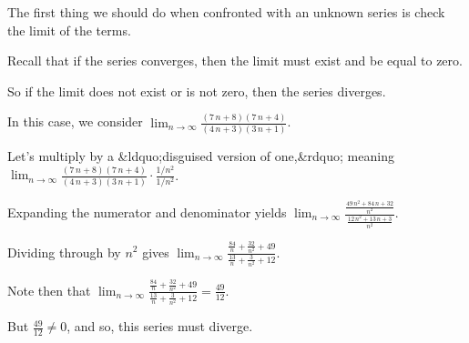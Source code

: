 \documentclass{ximera}
\begin{document}
\begin{question}
  \begin{solution}
    \begin{hint}
      The first thing we should do when confronted with an unknown series is check the limit of the terms.
    \end{hint}
    \begin{hint}
      Recall that if the series converges, then the limit must exist and be equal to zero.
    \end{hint}
    \begin{hint}
      So if the limit does not exist or is not zero, then the series diverges.
    \end{hint}
    \begin{hint}
      In this case, we consider \(\displaystyle\lim_{n \to \infty} \displaystyle\frac{ {\left(7 \, n + 8\right)} {\left(7 \, n + 4\right)}}{ {\left(4 \, n + 3\right)} {\left(3 \, n + 1\right)}}\).
    \end{hint}
    \begin{hint}
      Let's multiply by a &ldquo;disguised version of one,&rdquo; meaning \(\displaystyle\lim_{n \to \infty} \displaystyle\frac{ {\left(7 \, n + 8\right)} {\left(7 \, n + 4\right)}}{ {\left(4 \, n + 3\right)} {\left(3 \, n + 1\right)}} \cdot \displaystyle\frac{1/n^{2}}{1/n^{2}}\).
    \end{hint}
    \begin{hint}
      Expanding the numerator and denominator yields \(\displaystyle\lim_{n \to \infty} \displaystyle\frac{\displaystyle\frac{49 \, n^{2} + 84 \, n + 32}{n^{2}}}{\displaystyle\frac{12 \, n^{2} + 13 \, n + 3}{n^{2}}}\).
    \end{hint}
    \begin{hint}
      Dividing through by \(n^{2}\) gives \(\displaystyle\lim_{n \to \infty} \displaystyle\frac{\displaystyle\frac{84}{n} + \displaystyle\frac{32}{n^{2}} + 49}{\displaystyle\frac{13}{n} + \displaystyle\frac{3}{n^{2}} + 12}\).
    \end{hint}
    \begin{hint}
      Note then that \(\displaystyle\lim_{n \to \infty} \displaystyle\frac{\displaystyle\frac{84}{n} + \displaystyle\frac{32}{n^{2}} + 49}{\displaystyle\frac{13}{n} + \displaystyle\frac{3}{n^{2}} + 12} = \displaystyle\frac{49}{12}\).
    \end{hint}
    \begin{hint}
      But \(\displaystyle\frac{49}{12} \neq 0\), and so, this series must diverge.
      
    \end{hint}
    
    
    \begin{multiple-choice}
      
    \end{multiple-choice}
    
  \end{solution}
\end{question}
\end{document}

